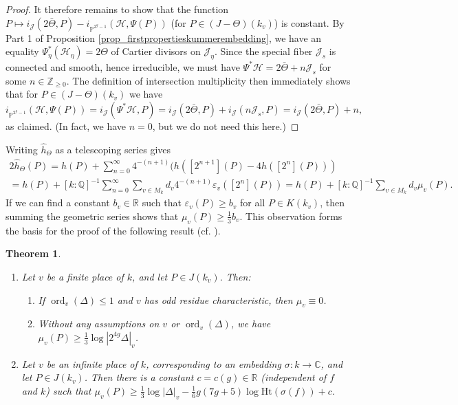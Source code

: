 \documentclass{article} %
\newtheorem{theorem}[proposition]{Theorem}
\numberwithin{equation}{section}
\newcommand{\sh}[1]{\mathscr{#1}}
\renewcommand{\P}{\mathbb{P}}
\newcommand{\R}{\mathbb{R}}
\newcommand{\Q}{\mathbb{Q}}
\newcommand{\bC}{\mathbb{C}}
\newcommand{\Z}{\mathbb{Z}}
\newcommand{\height}{\mathrm{Ht}}
\DeclareMathOperator{\ord}{ord}
\begin{document}
\begin{proof}
    It therefore remains to show that the function $P\mapsto i_{\sh{J}}(2\bar{\Theta},P) - i_{\P^{2^g-1}}(\mathcal{H},\Psi(P))$ (for $P\in (J-\Theta)(k_v)$) is constant.
    By Part 1 of Proposition \ref{prop_firstpropertieskummerembedding}, we have an equality $\Psi_{\eta}^*(\mathcal{H}_{\eta}) = 2\Theta$ of Cartier divisors on $\sh{J}_{\eta}$. 
    Since the special fiber $\sh{J}_s$ is connected and smooth, hence irreducible, we must have $\Psi^*\mathcal{H} = 2\bar{\Theta} + n  \sh{J}_s$ for some $n\in \Z_{\geq 0}$.
    The definition of intersection multiplicity then immediately shows that for $P\in (J-\Theta)(k_v)$ we have
    \[
    i_{\P^{2^g-1}}(\mathcal{H}, \Psi(P))
    = i_{\sh{J}}(\Psi^*\mathcal{H}, P) 
    = i_{\sh{J}}(2\bar{\Theta},P) + i_{\sh{J}}(n \sh{J}_s, P) = i_{\sh{J}}(2\bar{\Theta},P ) + n,
    \]
    as claimed.
    (In fact, we have $n=0$, but we do not need this here.)
\end{proof}
Writing $\widehat{h}_\Theta$ as a telescoping series gives
\begin{multline*} 2 \widehat{h}_\Theta(P) = h(P) + \sum_{n=0}^\infty 4^{-(n+1)} (h([2^{n+1}](P) - 4 h([2^n](P))) \\ = h(P) + [k : \Q]^{-1} \sum_{n=0}^\infty \sum_{v \in M_k} d_v 4^{-(n+1)} \varepsilon_v([2^n](P)) = h(P) + [k : \Q]^{-1} \sum_{v \in M_k} d_v \mu_v(P). 
\end{multline*}
If we can find a constant $b_v \in \R$ such that $\varepsilon_v(P) \geq b_v$ for all $P \in K(k_v)$, then summing the geometric series shows that  $\mu_v(P) \geq \frac{1}{3} b_v$. This observation forms the basis for the proof of the following result (cf. \cite[Theorem 6.1]{Sto99}).
\begin{theorem}\label{thm_canonical_height_difference}
    \begin{enumerate} \item Let $v$ be a finite place of $k$, and let $P \in J(k_v)$. Then: 
    \begin{enumerate}
        \item If $\ord_v(\Delta) \leq 1$ and $v$ has odd residue characteristic, then $\mu_v \equiv 0$.
        \item Without any assumptions on $v$ or $\ord_v(\Delta)$, we have $\mu_v(P) \geq  \frac{1}{3} \log |2^{4 g} \Delta|_v$. 
    \end{enumerate}
    \item Let $v$ be an infinite place of $k$, corresponding to an embedding $\sigma : k \to \bC$, and let $P \in J(k_v)$. Then there is a constant $c = c(g) \in \R$ (independent of $f$ and $k$) such that $\mu_v(P) \geq \frac{1}{3} \log |\Delta|_v - \frac{1}{6} g(7g+5) \log \height(\sigma(f)) + c$.
    \end{enumerate} 
\end{theorem}
\end{document}
